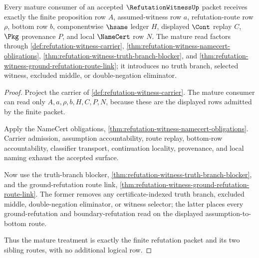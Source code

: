 \begin{theorem}
\label{thm:refutation-witness-mature-treatment}
Every mature consumer of an accepted $\RefutationWitnessUp$ packet receives exactly the finite proposition row $A$, assumed-witness row $a$, refutation-route row $\rho$, bottom row $b$, componentwise $\hsame$ ledger $H$, displayed $\Cont$ replay $C$, $\Pkg$ provenance $P$, and local $\NameCert$ row $N$. The mature read factors through \autoref{def:refutation-witness-carrier}, \autoref{thm:refutation-witness-namecert-obligations}, \autoref{thm:refutation-witness-truth-branch-blocker}, and \autoref{thm:refutation-witness-ground-refutation-route-link}; it introduces no truth branch, selected witness, excluded middle, or double-negation eliminator.
\end{theorem}
\begin{proof}
Project the carrier of \autoref{def:refutation-witness-carrier}. The mature consumer can read only $A,a,\rho,b,H,C,P,N$, because these are the displayed rows admitted by the finite packet.

Apply the NameCert obligations, \autoref{thm:refutation-witness-namecert-obligations}. Carrier admission, assumption accountability, route replay, bottom-row accountability, classifier transport, continuation locality, provenance, and local naming exhaust the accepted surface.

Now use the truth-branch blocker, \autoref{thm:refutation-witness-truth-branch-blocker}, and the ground-refutation route link, \autoref{thm:refutation-witness-ground-refutation-route-link}. The former removes any certificate-indexed truth branch, excluded middle, double-negation eliminator, or witness selector; the latter places every ground-refutation and boundary-refutation read on the displayed assumption-to-bottom route.

Thus the mature treatment is exactly the finite refutation packet and its two sibling routes, with no additional logical row.
\end{proof}


